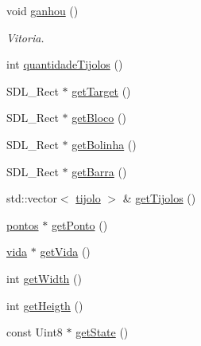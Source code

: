 \begin{DoxyCompactItemize}
void \hyperlink{classview_abbf5bc2a4455e61eb8155f8256a5d870}{ganhou} ()
\begin{DoxyCompactList}\small\item\em Vitoria. \end{DoxyCompactList}\item 
int \hyperlink{classview_a257d50065961954053fbf5402b2e2968}{quantidade\+Tijolos} ()
\item 
S\+D\+L\+\_\+\+Rect $\ast$ \hyperlink{classview_a4bf37f4171f4bb15c0e5b4ab8c2a9faa}{get\+Target} ()
\item 
S\+D\+L\+\_\+\+Rect $\ast$ \hyperlink{classview_a8b12f1f06de39d6e9f70f54a9281e05c}{get\+Bloco} ()
\item 
S\+D\+L\+\_\+\+Rect $\ast$ \hyperlink{classview_a8eb9d89d9b55a5d2ee529c96e0dc246a}{get\+Bolinha} ()
\item 
S\+D\+L\+\_\+\+Rect $\ast$ \hyperlink{classview_a57b60e5da21e0484081d71c69ba4d03e}{get\+Barra} ()
\item 
std\+::vector$<$ \hyperlink{classtijolo}{tijolo} $>$ \& \hyperlink{classview_a7546f44b45cd308c1c893e222701ec51}{get\+Tijolos} ()
\item 
\hyperlink{classpontos}{pontos} $\ast$ \hyperlink{classview_a6cd53aa4df2642579992803a18f0bc8b}{get\+Ponto} ()
\item 
\hyperlink{classvida}{vida} $\ast$ \hyperlink{classview_aa33f3e6bf59ada95ee9fd0bff5af22c0}{get\+Vida} ()
\item 
int \hyperlink{classview_aba1c490d357bb58f4aa9218cb96b42b0}{get\+Width} ()
\item 
int \hyperlink{classview_af2cf0c4a4d7cd84f0155ae1ad6a51d0a}{get\+Heigth} ()
\item 
const Uint8 $\ast$ \hyperlink{classview_a5dd0f6c8f5d5f9123353986607c7fb77}{get\+State} ()
\end{DoxyCompactItemize}

